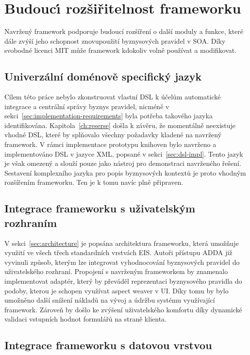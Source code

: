 \section{Budouc\'{\i} rozšiřitelnost frameworku}

Navržený framework podporuje budoucí rozšíření o další moduly a funkce, které
dále zvýší jeho schopnost znovupoužití byznysových pravidel v \gls{SOA}.
Díky svobodné licenci \gls{MIT} může framework kdokoliv volně používat a modifikovat.

\subsection{Univerzální doménově specifický jazyk}
Cílem této práce nebylo zkonstruovat vlastní \gls{DSL}
k účelům automatické integrace a centrální správy byznys pravidel,
nicméně v sekci~\ref{sec:implementation-requirements} byla potřeba takového
jazyka identifikována. Kapitola~\ref{ch:reserse}
došla k závěru, že momentálně neexistuje vhodné \gls{DSL},
které by splňovalo všechny požadavky kladené na navržený framework.
V rámci implementace prototypu knihoven
bylo navrženo a implementováno \gls{DSL} v jazyce \gls{XML},
popsané v sekci~\ref{sec:dsl-impl}. Tento jazyk je však
omezený a slouží pouze jako nástroj pro demonstraci navrženého řešení.
Sestavení komplexního jazyka pro popis byznysových kontextů je proto vhodným
rozšířením frameworku. Ten je k tomu navíc plně připraven.

\subsection{Integrace frameworku s uživatelským rozhraním}

V sekci~\ref{sec:architecture} je popsána architektura frameworku, která umožňuje využití
ve všech třech standardních vrstvách \gls{EIS}. Autoři přístupu \gls{ADDA} již
vyvinuli způsob, kterým lze integrovat vyhodnocování byznysových pravidel do uživatelského
rozhraní. Propojení s navrženým frameworkem by znamenalo implementovat adaptér, který by převáděl
reprezentaci byznysového pravidla do podoby, kterou je schopen využívat aspect weaver v \gls{UI}.
Díky tomu by bylo umožněno další snížení nákladů na vývoj a údržbu systému využívající framework.
Zároveň by došlo ke zvýšení uživatelského komfortu díky dynamické validaci vstupních hodnot formulářů
na straně klienta.

\subsection{Integrace frameworku s datovou vrstvou}

